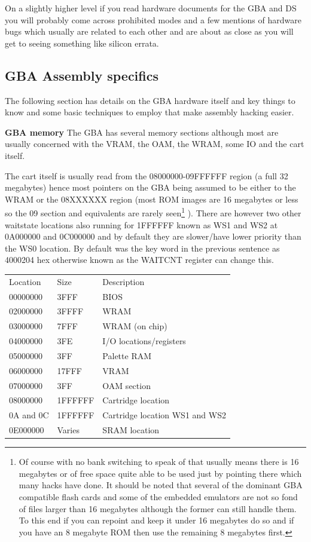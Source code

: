\documentclass[
]{book}
\begin{document}
On a slightly higher level if you read hardware documents for the GBA and DS you will probably come across prohibited modes and a few mentions of hardware bugs which usually are related to each other and are about as close as you will get to seeing something like silicon errata.

\hypertarget{gba-assembly-specifics}{%
\subsection{GBA Assembly specifics}\label{gba-assembly-specifics}}

The following section has details on the GBA hardware itself and key things to know and some basic techniques to employ that make assembly hacking easier.

\textbf{GBA memory} The GBA has several memory sections although most are usually concerned with the VRAM, the OAM, the WRAM, some IO and the cart itself.

The cart itself is usually read from the 08000000-09FFFFFF region (a full 32 megabytes) hence most pointers on the GBA being assumed to be either to the WRAM or the 08XXXXXX region (most ROM images are 16 megabytes or less so the 09 section and equivalents are rarely seen\footnote{Of course with no bank switching to speak of that usually means there is 16 megabytes or of free space quite able to be used just by pointing there which many hacks have done. It should be noted that several of the dominant GBA compatible flash cards and some of the embedded emulators are not so fond of files larger than 16 megabytes although the former can still handle them. To this end if you can repoint and keep it under 16 megabytes do so and if you have an 8 megabyte ROM then use the remaining 8 megabytes first.} ). There are however two other waitstate locations also running for 1FFFFFF known as WS1 and WS2 at 0A000000 and 0C000000 and by default they are slower/have lower priority than the WS0 location. By default was the key word in the previous sentence as 4000204 hex otherwise known as the WAITCNT register can change this.

\begin{longtable}[]{@{}lll@{}}
\toprule()
\endhead
Location & Size & Description \\
00000000 & 3FFF & BIOS \\
02000000 & 3FFFF & WRAM \\
03000000 & 7FFF & WRAM (on chip) \\
04000000 & 3FE & I/O locations/registers \\
05000000 & 3FF & Palette RAM \\
06000000 & 17FFF & VRAM \\
07000000 & 3FF & OAM section \\
08000000 & 1FFFFFF & Cartridge location \\
0A and 0C & 1FFFFFF & Cartridge location WS1 and WS2 \\
0E000000 & Varies & SRAM location \\
\bottomrule()
\end{longtable}
\end{document}
